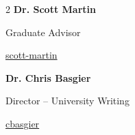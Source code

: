 \documentclass[10pt,a4paper,ragged2e,withhyper]{altacv}
\begin{document}
\begin{paracol}{2}
  \divider
  \textcolor{emphasis}{\textbf{Dr. Scott Martin}}\par
  {Graduate Advisor}\par
  \begin{description}[font=\color{accent},style=multiline,leftmargin=1.35em,align=left]
    \item[\small\normalfont\faLinkedin]\href{https://linkedin.com/in/scott-martin-851b19139}{scott-martin}
  \end{description}
  \divider
  \textcolor{emphasis}{\textbf{Dr. Chris Basgier}}\par
  {Director -- University Writing}\par
  \begin{description}[font=\color{accent},style=multiline,leftmargin=1.35em,align=left]
    \item[\small\normalfont\faLinkedin]\href{https://linkedin.com/in/cbasgier}{cbasgier}
  \end{description}
  \smallskip





  \newpage

  \switchcolumn


\end{paracol}
\end{document}
